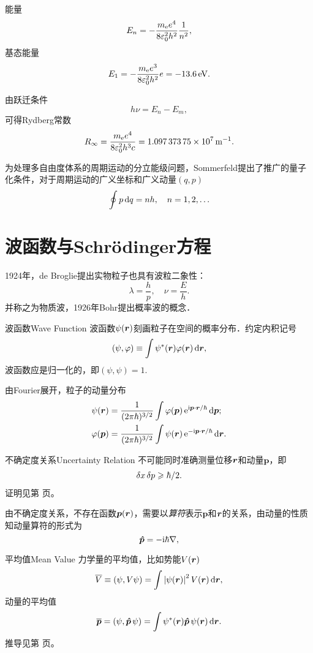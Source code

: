 能量
\begin{align}
	E_n=-\frac{m_\mathrm e e^4}{8\varepsilon_0^2h^2}\frac1{n^2},
\end{align}
基态能量
\[
E_1=-\frac{m_\elc e^3}{8\ve_0^2h^2}e=\SI{-13.6}{\eV}.
\]

由跃迁条件
\[
h\nu=E_n-E_m,
\]
可得Rydberg常数
\[
R_\infty=\frac{m_\elc e^4}{8\ve_0^2h^3c}=\SI{1.09737375e7}{\per\m}.
\]

为处理多自由度体系的周期运动的分立能级问题，Sommerfeld提出了推广的量子化条件，对于周期运动的广义坐标和广义动量$(q,p)$
\begin{align}
	\oint p\mathop{}\!\mathrm{d} q=nh,\quad n=1,2,\ldots
\end{align}
\clearpage
\section[波函数]{波函数与Schrödinger方程}
1924年，de Broglie提出实物粒子也具有波粒二象性：
\[
	\lambda=\frac hp,\quad\nu=\frac Eh.
\]
并称之为物质波，1926年Bohr提出概率波的概念．
\begin{definition}{波函数}{Wave Function}
	波函数$\psi(\bm r)$刻画粒子在空间的概率分布．约定内积记号
	\[
		(\psi,\varphi)\equiv\int\psi^*(\bm r)\varphi(\bm r)\mathop{}\!\mathrm{d}\bm r,
\]
	波函数应是归一化的，即$(\psi,\psi)=1.$
\end{definition}
由Fourier展开，粒子的动量分布
\begin{align}
	\psi(\bm r)       & =\frac1{(2\pi\hbar)^{3/2}}\int\varphi(\bm p)\mathop{}\!\mathrm{e}^{\mathrm{i}\bm p\cdot\bm r/\hbar}\mathop{}\!\mathrm{d}\bm p; \\
	\varphi(\bm p) & =\frac1{(2\pi\hbar)^{3/2}}\int\psi(\bm r)\mathop{}\!\mathrm{e}^{-\mathrm{i}\bm p\cdot\bm r/\hbar}\mathop{}\!\mathrm{d}\bm r.
\end{align}
\begin{theorem}{不确定度关系}{Uncertainty Relation}
	不可能同时准确测量位移$\bm r$和动量$\bm p$，即
	\begin{align}
		\delta x\mathop{}\!\delta p\geqslant\hbar/2.
	\end{align}
	证明见第 \pageref{Proof of UR} 页。
\end{theorem}
由不确定度关系，不存在函数$\bm p(\bm r)$，需要以\textit{算符}表示$\bm p$和$\bm r$的关系，由动量的性质知动量算符的形式为
\[
	\bm{\hat p}\!\mathop{}=-\mathrm{i}\hbar\nabla,
\]
\begin{definition}{平均值}{Mean Value}
	力学量的平均值，比如势能$V(\bm r)$
	\[
		\overline V\equiv(\psi,V\psi)=\int\left\lvert\psi(\bm r)\right\rvert^2V(\bm r)\mathop{}\!\mathrm{d}\bm r,
	\]
	动量的平均值
	\[
		\overline{\bm p}=(\psi,\bm{\hat p}\!\mathop{}\psi)=\int\psi^*(\bm r)\bm{\hat p}\!\mathop{}\psi(\bm r)\mathop{}\!\mathrm{d}\bm r.
	\]
	推导见第 \pageref{Derivation of Mean Value} 页。
\end{definition}
